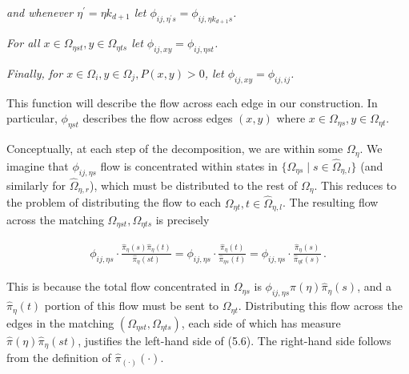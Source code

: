 \documentclass[10pt,a4paper]{article}
\begin{document}
\emph{and whenever $\eta^{\prime}=\eta k_{d+1}$ let $\phi_{ij,\eta^{\prime}s}=\phi_{ij,\eta k_{d+1}s}$.}\par




\emph{For all $x\in\Omega_{\eta st},y\in\Omega_{\eta ts}$ let $\phi_{ij,xy}=\phi_{ij,\eta st}$.}\par




\emph{Finally, for $x\in\Omega_{i},y\in\Omega_{j},P(x,y)>0$, let $\phi_{ij,xy}=\phi_{ij,ij}$.}\par






This function will describe the flow across each edge in our construction. In particular, $\phi_{\eta st}$ describes the flow across edges $(x,y)$ where $x\in\Omega_{\eta s},y\in\Omega_{\eta t}$.\par




Conceptually, at each step of the decomposition, we are within some $\Omega_{\eta}$. We imagine that $\phi_{ij,\eta s}$ flow is concentrated within states in $\{\Omega_{\eta s}\mid s\in\hat{\Omega}_{\eta,l}\}$ (and similarly for $\hat{\Omega}_{\eta,r}$), which must be distributed to the rest of $\Omega_{\eta}$. This reduces to the problem of distributing the flow to each $\Omega_{\eta t},t\in\hat{\Omega}_{\eta,l}$. The resulting flow across the matching $\Omega_{\eta st},\Omega_{\eta ts}$ is precisely\par


\[\begin{gathered}
\displaystyle\phi_{ij,\eta s}\cdot\frac{\hat{\pi}_{\eta}(s)\hat{\pi}_{\eta}(t)}{\hat{\pi}_{\eta}(st)} \displaystyle=\phi_{ij,\eta s}\cdot\frac{\hat{\pi}_{\eta}(t)}{\hat{\pi}_{\eta s}(t)}=\phi_{ij,\eta s}\cdot\frac{\hat{\pi}_{\eta}(s)}{\hat{\pi}_{\eta t}(s)}\,.
\end{gathered}\]


This is because the total flow concentrated in $\Omega_{\eta s}$ is $\phi_{ij,\eta s}\hat{\pi}(\eta)\hat{\pi}_{\eta}(s)$, and a $\hat{\pi}_{\eta}(t)$ portion of this flow must be sent to $\Omega_{\eta t}$. Distributing this flow across the edges in the matching $(\Omega_{\eta st},\Omega_{\eta ts})$, each side of which has measure $\hat{\pi}(\eta)\hat{\pi}_{\eta}(st)$, justifies the left-hand side of (5.6). The right-hand side follows from the definition of $\hat{\pi}_{(\cdot)}(\cdot)$.\par
\end{document}
